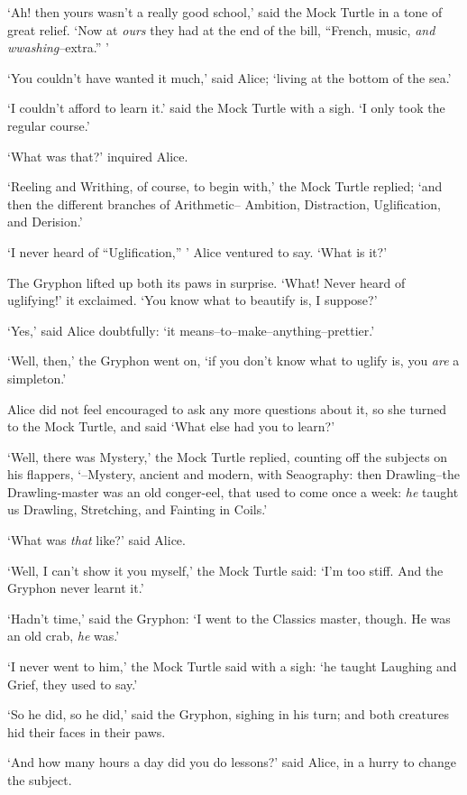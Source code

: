   `Ah! then yours wasn't a really good school,' said the Mock
Turtle in a tone of great relief.  `Now at {\it ours} they had at the
end of the bill, ``French, music, {\it and wwashing}--extra.'' '

  `You couldn't have wanted it much,' said Alice; `living at the
bottom of the sea.'

  `I couldn't afford to learn it.' said the Mock Turtle with a
sigh.  `I only took the regular course.'

  `What was that?' inquired Alice.

  `Reeling and Writhing, of course, to begin with,' the Mock
Turtle replied; `and then the different branches of Arithmetic--
Ambition, Distraction, Uglification, and Derision.'

  `I never heard of ``Uglification,'' ' Alice ventured to say.  `What is it?'

  The Gryphon lifted up both its paws in surprise.  `What!  Never
heard of uglifying!' it exclaimed.  `You know what to beautify is,
I suppose?'

  `Yes,' said Alice doubtfully:  `it means--to--make--anything--prettier.'

  `Well, then,' the Gryphon went on, `if you don't know what to
uglify is, you {\it are} a simpleton.'

  Alice did not feel encouraged to ask any more questions about
it, so she turned to the Mock Turtle, and said `What else had you
to learn?'

  `Well, there was Mystery,' the Mock Turtle replied, counting
off the subjects on his flappers, `--Mystery, ancient and modern,
with Seaography:  then Drawling--the Drawling-master was an old
conger-eel, that used to come once a week:  {\it he} taught us
Drawling, Stretching, and Fainting in Coils.'

  `What was {\it that} like?' said Alice.

  `Well, I can't show it you myself,' the Mock Turtle said:  `I'm
too stiff.  And the Gryphon never learnt it.'

  `Hadn't time,' said the Gryphon:  `I went to the Classics
master, though.  He was an old crab, {\it he} was.'

  `I never went to him,' the Mock Turtle said with a sigh:  `he
taught Laughing and Grief, they used to say.'

  `So he did, so he did,' said the Gryphon, sighing in his turn;
and both creatures hid their faces in their paws.

  `And how many hours a day did you do lessons?' said Alice, in a
hurry to change the subject.

